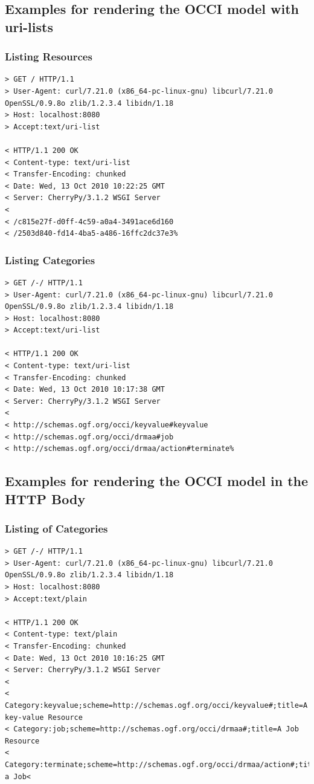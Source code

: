\documentclass[10pt,a4paper]{article}
\begin{document}
\subsection{Examples for rendering the OCCI model with uri-lists}

\subsubsection{Listing Resources}

\begin{verbatim}
> GET / HTTP/1.1
> User-Agent: curl/7.21.0 (x86_64-pc-linux-gnu) libcurl/7.21.0 OpenSSL/0.9.8o zlib/1.2.3.4 libidn/1.18
> Host: localhost:8080
> Accept:text/uri-list

< HTTP/1.1 200 OK
< Content-type: text/uri-list
< Transfer-Encoding: chunked
< Date: Wed, 13 Oct 2010 10:22:25 GMT
< Server: CherryPy/3.1.2 WSGI Server
< 
< /c815e27f-d0ff-4c59-a0a4-3491ace6d160
< /2503d840-fd14-4ba5-a486-16ffc2dc37e3%  
\end{verbatim}

\subsubsection{Listing Categories}

\begin{verbatim}
> GET /-/ HTTP/1.1
> User-Agent: curl/7.21.0 (x86_64-pc-linux-gnu) libcurl/7.21.0 OpenSSL/0.9.8o zlib/1.2.3.4 libidn/1.18
> Host: localhost:8080
> Accept:text/uri-list

< HTTP/1.1 200 OK
< Content-type: text/uri-list
< Transfer-Encoding: chunked
< Date: Wed, 13 Oct 2010 10:17:38 GMT
< Server: CherryPy/3.1.2 WSGI Server
< 
< http://schemas.ogf.org/occi/keyvalue#keyvalue
< http://schemas.ogf.org/occi/drmaa#job
< http://schemas.ogf.org/occi/drmaa/action#terminate%    
\end{verbatim}

\subsection{Examples for rendering the OCCI model in the HTTP Body}

\subsubsection{Listing of Categories}

\begin{verbatim}
> GET /-/ HTTP/1.1
> User-Agent: curl/7.21.0 (x86_64-pc-linux-gnu) libcurl/7.21.0 OpenSSL/0.9.8o zlib/1.2.3.4 libidn/1.18
> Host: localhost:8080
> Accept:text/plain

< HTTP/1.1 200 OK
< Content-type: text/plain
< Transfer-Encoding: chunked
< Date: Wed, 13 Oct 2010 10:16:25 GMT
< Server: CherryPy/3.1.2 WSGI Server
< 
< Category:keyvalue;scheme=http://schemas.ogf.org/occi/keyvalue#;title=A key-value Resource
< Category:job;scheme=http://schemas.ogf.org/occi/drmaa#;title=A Job Resource
< Category:terminate;scheme=http://schemas.ogf.org/occi/drmaa/action#;title=Terminate a Job< 
\end{verbatim}
\end{document}
